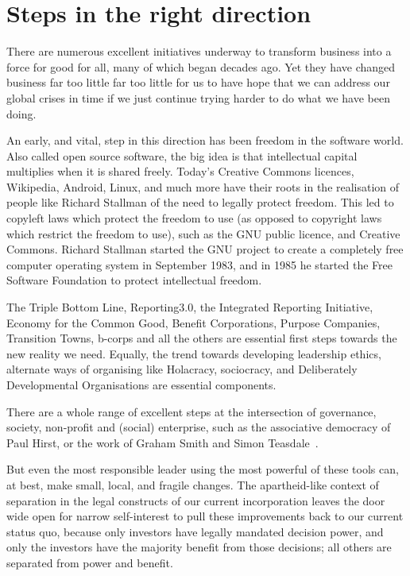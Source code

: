 \section{Steps in the right direction}
There are numerous excellent initiatives underway to transform business into a force for good for all, many of which began decades ago. Yet they have changed business far too little far too little for us to have hope that we can address our global crises in time if we just continue trying harder to do what we have been doing.


An early, and vital, step in this direction has been freedom in the software world. Also called open source software, the big idea is that intellectual capital multiplies when it is shared freely.  Today's Creative Commons licences, Wikipedia, Android, Linux, and much more have their roots in the realisation of people like Richard Stallman\cite{williams-free} of the need to legally protect freedom. This led to copyleft laws which protect the freedom to use (as opposed to copyright laws which restrict the freedom to use), such as the GNU public licence, and Creative Commons. Richard Stallman started the GNU project to create a completely free computer operating system in September 1983, and in 1985 he started the Free Software Foundation to protect intellectual freedom. 


The Triple Bottom Line\cite{elkington-triple}, Reporting3.0, the Integrated Reporting Initiative, Economy for the Common Good, Benefit Corporations, Purpose Companies, Transition Towns, b-corps and all the others are essential first steps towards the new reality we need. Equally, the trend towards developing leadership ethics, alternate ways of organising like Holacracy\cite{robertson-holacracy}, sociocracy\cite{rau-sociocracy}, and Deliberately Developmental Organisations\cite{kegan-everyone} are essential components.


There are a whole range of excellent steps at the intersection of governance, society, non-profit and (social) enterprise, such as the associative democracy of Paul Hirst, or the work of Graham Smith and Simon Teasdale~\cite{smith-teasdale-associative}.


But even the most responsible leader using the most powerful of these tools can, at best, make small, local, and fragile changes. The apartheid-like context of separation in the legal constructs of our current incorporation leaves the door wide open for narrow self-interest to pull these improvements back to our current status quo, because only investors have legally mandated decision power, and only the investors have the majority benefit from those decisions; all others are separated from power and benefit.


